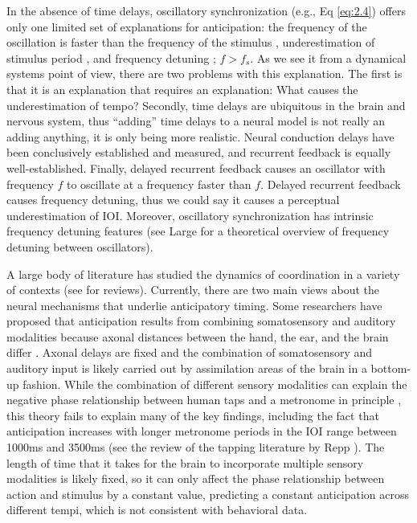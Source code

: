 \documentclass{report}
\begin{document}
In the absence of time delays, oscillatory synchronization (e.g., Eq \eqref{eq:2.4}) offers only one limited set of explanations for anticipation: the frequency of the oscillation is faster than the frequency of the stimulus \cite{kim2015signal}, underestimation of stimulus period \cite{flach2005transition}, and frequency detuning \cite{kelso1990action}; $f > f_s$. As we see it from a dynamical systems point of view, there are two problems with this explanation. The first is that it is an explanation that requires an explanation: What causes the underestimation of tempo? Secondly, time delays are ubiquitous in the brain and nervous system, thus “adding” time delays to a neural model is not really an adding anything, it is only being more realistic. Neural conduction delays have been conclusively established and measured, and recurrent feedback is equally well-established. Finally, delayed recurrent feedback causes an oscillator with frequency $f$ to oscillate at a frequency faster than $f$. Delayed recurrent feedback causes frequency detuning, thus we could say it causes a perceptual underestimation of IOI. Moreover, oscillatory synchronization has intrinsic frequency detuning features (see Large \cite{large2008resonating} for a theoretical overview of frequency detuning between oscillators).

A large body of literature has studied the dynamics of coordination in a variety of contexts (see \cite{repp2005sensorimotor, repp2013sensorimotor} for reviews). Currently, there are two main views about the neural mechanisms that underlie anticipatory timing. Some researchers have proposed that anticipation results from combining somatosensory and auditory modalities because axonal distances between the hand, the ear, and the brain differ \cite{aschersleben1995synchronizing, prinz1992don}. Axonal delays are fixed and the combination of somatosensory and auditory input is likely carried out by assimilation areas of the brain in a bottom-up fashion. While the combination of different sensory modalities can explain the negative phase relationship between human taps and a metronome in principle \cite{aschersleben2002temporal, bialunska2011increasing}, this theory fails to explain many of the key findings, including the fact that anticipation increases with longer metronome periods in the IOI range between 1000ms and 3500ms (see the review of the tapping literature by Repp \cite{repp2005sensorimotor}). The length of time that it takes for the brain to incorporate multiple sensory modalities is likely fixed, so it can only affect the phase relationship between action and stimulus by a constant value, predicting a constant anticipation across different tempi, which is not consistent with behavioral data.
\end{document}
